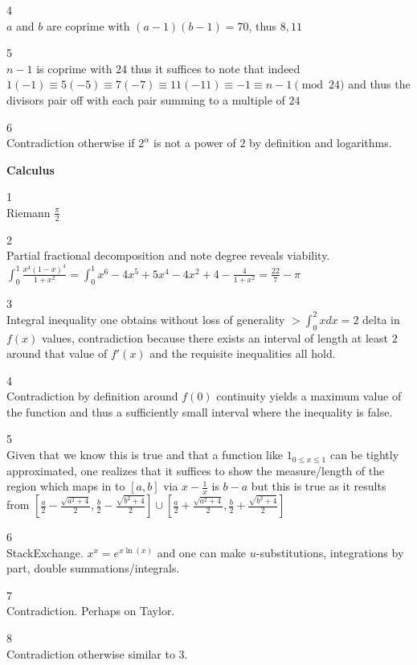4 \\
$a$ and $b$ are coprime with $(a-1)(b-1)=70$, thus $\boxed{8,11}$

5 \\
$n-1$ is coprime with $24$ thus it suffices to note that indeed $1(-1) \equiv 5(-5) \equiv 7(-7) \equiv 11(-11) \equiv -1 \equiv n-1 \pmod{24}$ and thus the divisors pair off with each pair summing to a multiple of $24$

6 \\
Contradiction otherwise if $2^{\alpha}$ is not a power of $2$ by definition and logarithms.

\newpage

\textbf{Calculus}

1 \\
Riemann $\boxed{\frac{\pi}{2}}$

2 \\
Partial fractional decomposition and note degree reveals viability. $\int_0^1 \frac{x^4(1-x)^4}{1+x^2} = \int_0^1 x^6-4x^5+5x^4-4x^2+4-\frac{4}{1+x^2} = \boxed{\frac{22}{7}-\pi}$

3 \\
Integral inequality one obtains without loss of generality $> \int_0^2 x dx=2$ delta in $f(x)$ values, contradiction because there exists an interval of length at least $2$ around that value of $f'(x)$ and the requisite inequalities all hold.

4 \\
Contradiction by definition around $f(0)$ continuity yields a maximum value of the function and thus a sufficiently small interval where the inequality is false.

5 \\
Given that we know this is true and that a function like $1_{0 \le x \le 1}$ can be tightly approximated, one realizes that it suffices to show the measure/length of the region which maps in to $[a,b]$ via $x-\frac{1}{x}$ is $b-a$ but this is true as it results from $[\frac{a}{2}-\frac{\sqrt{a^2+4}}{2},\frac{b}{2}-\frac{\sqrt{b^2+4}}{2}] \cup [\frac{a}{2}+\frac{\sqrt{a^2+4}}{2},\frac{b}{2}+\frac{\sqrt{b^2+4}}{2}]$

6 \\
StackExchange. $x^x=e^{x\ln(x)}$ and one can make $u$-substitutions, integrations by part, double summations/integrals.

7 \\
Contradiction. Perhaps on Taylor.

8 \\
Contradiction otherwise similar to 3.

